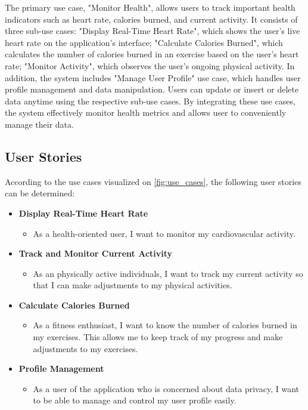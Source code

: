 The primary use case, "Monitor Health", allows users to track important health indicators such as heart rate, calories burned, and current activity. It consists of three sub-use cases: "Display Real-Time Heart Rate", which shows the user's live heart rate on the application's interface; "Calculate Calories Burned", which calculates the number of calories burned in an exercise based on the user's heart rate;  "Monitor Activity", which observes the user's ongoing physical activity. In addition, the system includes "Manage User Profile" use case, which handles user profile management and data manipulation. Users can update or insert or delete data anytime using the respective sub-use cases. By integrating these use cases, the system effectively monitor health metrics and allows user to conveniently manage their data.

\subsection{User Stories}
\label{chap:user_stories}
According to the use cases visualized on \autoref{fig:use_cases}, the following user stories can be determined:

\begin{itemize}[label={},leftmargin=*]
    \item \textbf{Display Real-Time Heart Rate}
      \begin{itemize}[label={},leftmargin=*]
        \item As a health-oriented user, I want to monitor my cardiovascular activity.
      \end{itemize}

    \item \textbf{Track and Monitor Current Activity}
      \begin{itemize}[label={},leftmargin=*]
        \item As an physically active individuals, I want to track my current activity so that I can make adjustments to my physical activities.
      \end{itemize}

    \item \textbf{Calculate Calories Burned}
      \begin{itemize}[label={},leftmargin=*]
        \item As a fitness enthusiast, I want to know the number of calories burned in my exercises. This allows me to keep track of my progress and make adjustments to my exercises.
      \end{itemize}  

    \item \textbf{Profile Management}
      \begin{itemize}[label={},leftmargin=*]
        \item As a user of the application who is concerned about data privacy, I want to be able to manage and control my user profile easily. 
      \end{itemize}
  \end{itemize}


